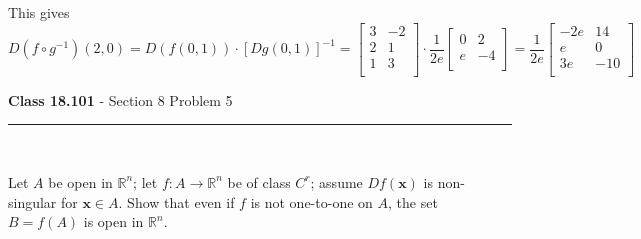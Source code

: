 \documentclass[11pt,reqno]{article}
\begin{document}
\noindent This gives
\[ D(f \circ g^{-1}) (2,0) = D(f(0,1)) \cdot [D g (0,1)]^{-1} =   \left[ \begin{array}{cc}
3 & -2 \\
2 & 1 \\
1 & 3 \\
\end{array} \right] \cdot \frac{1}{2 e} \left[ \begin{array}{cc}
0 & 2 \\
e & -4 \\
\end{array} \right] =  \frac{1}{2 e} \left[ \begin{array}{cc}
-2e & 14 \\
e & 0 \\
3 e & -10 \\
\end{array} \right] \]


\begin{flushleft} 
\textbf{Class 18.101} - Section 8 Problem 5\\
\rule{500pt}{1pt}\\
\end{flushleft} 

Let $A$ be open in $\mathbb{R}^n$; let $f : A \to \mathbb{R}^n$ be of class $C^r$; assume $Df(\textbf{x})$ is non-singular for $\textbf{x} \in A$. Show that even if $f$ is not one-to-one on $A$, the set $B = f(A)$ is open in $\mathbb{R}^n$.
\end{document}
